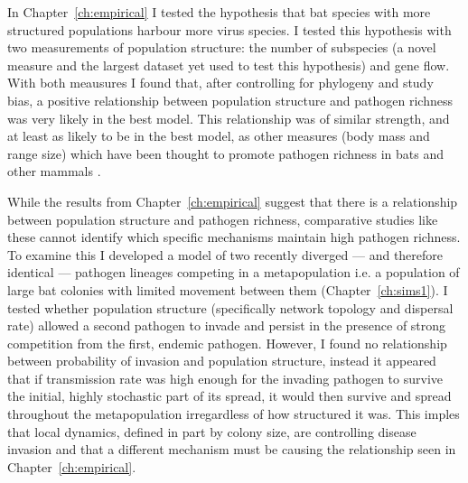 


In Chapter~\ref{ch:empirical} I tested the hypothesis that bat species with more structured populations harbour more virus species.
I tested this hypothesis with two measurements of population structure: the number of subspecies (a novel measure and the largest dataset yet used to test this hypothesis) and gene flow.
With both meausures I found that, after controlling for phylogeny and study bias, a positive relationship between population structure and pathogen richness was very likely in the best model.
This relationship was of similar strength, and at least as likely to be in the best model, as other measures (body mass and range size) which have been thought to promote pathogen richness in bats and other mammals \cite{kamiya2014determines, arneberg2002host, gay2014parasite, nunn2003comparative, turmelle2009correlates}.




While the results from Chapter~\ref{ch:empirical} suggest that there is a relationship between population structure and pathogen richness, comparative studies like these cannot identify which specific mechanisms maintain high pathogen richness.
To examine this I developed a model of two recently diverged --- and therefore identical --- pathogen lineages competing in a metapopulation i.e. a population of large bat colonies with limited movement between them (Chapter~\ref{ch:sims1}). 
I tested whether population structure (specifically network topology and dispersal rate) allowed a second pathogen to invade and persist in the presence of strong competition from the first, endemic pathogen.
However, I found no relationship between probability of invasion and population structure, instead it appeared that if transmission rate was high enough for the invading pathogen to survive the initial, highly stochastic part of its spread, it would then survive and spread throughout the metapopulation irregardless of how structured it was.
This imples that local dynamics, defined in part by colony size, are controlling disease invasion and that a different mechanism must be causing the relationship seen in Chapter~\ref{ch:empirical}.


